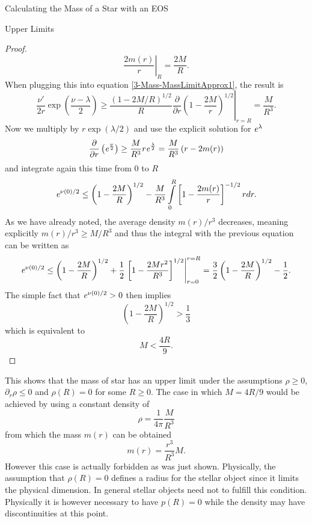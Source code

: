 \begin{section}{Calculating the Mass of a Star with an EOS}
\begin{subsection}{Upper Limits}
\begin{proof}
	\begin{equation}
		\left.\frac{2m(r)}{r}\right|_R = \frac{2M}{R}.
	\end{equation}
	When plugging this into equation \eqref{3-Mass-MassLimitApprox1}, the result is
	\begin{equation}
		\frac{\nu'}{2r}\exp\left(\frac{\nu-\lambda}{2}\right)\geq\frac{(1-2M/R)^{1/2}}{R}\left.\frac{\partial}{\partial r}\left(1-\frac{2M}{r}\right)^{1/2}\right|_{r=R} = \frac{M}{R^3}.
	\end{equation}
	Now we multiply by $r\exp(\lambda/2)$ and use the explicit solution for $\mathit{e}^\lambda$
	\begin{equation}
		\frac{\partial}{\partial r}\left(\mathit{e}^{\frac{\nu}{2}}\right) \geq \frac{M}{R^3}r\mathit{e}^\frac{\lambda}{2} = \frac{M}{R^3}\left(r-2m(r)\right)
	\end{equation}
	and integrate again this time from $0$ to $R$
	\begin{equation}
		\mathit{e}^{\nu(0)/2}\leq\left(1-\frac{2M}{R}\right)^{1/2}-\frac{M}{R^3}\int\limits_0^R\left[1-\frac{2m(r)}{r} \right]^{-1/2}rdr.
		\label{3-Mass-MassLimitNuApprox}
	\end{equation}
	As we have already noted, the average density $m(r)/r^3$ decreases, meaning explicitly $m(r)/r^3\geq M/R^3$ and thus the integral with the previous equation can be written as
	\begin{equation}
		\mathit{e}^{\nu(0)/2}\leq\left(1-\frac{2M}{R}\right)^{1/2}+\frac{1}{2}\left.\left[1-\frac{2Mr^2}{R^3} \right]^{1/2}\right|^{r=R}_{r=0} = \frac{3}{2}\left(1-\frac{2M}{R}\right)^{1/2} - \frac{1}{2}.
	\end{equation}
	The simple fact that $\mathit{e}^{\nu(0)/2}>0$ then implies
	\begin{equation}
		\left(1-\frac{2M}{R}\right)^{1/2} > \frac{1}{3}
	\end{equation}
	which is equivalent to
	\begin{equation}
		M< \frac{4R}{9}.
	\end{equation}
\end{proof}\noindent
This shows that the mass of star has an upper limit under the assumptions $\rho\geq0$, $\partial_r\rho\leq0$ and $\rho(R)=0$ for some $R\geq0$. The case in which $M=4R/9$ would be achieved by using a constant density of 
\begin{equation}
	\rho = \frac{1}{4\pi}\frac{M}{R^3}
\end{equation}
from which the mass $m(r)$ can be obtained
\begin{equation}
	m(r) = \frac{r^3}{R^3}M.
\end{equation}
However this case is actually forbidden as was just shown. Physically, the assumption that $\rho(R)=0$ defines a radius for the stellar object since it limits the physical dimension. In general stellar objects need not to fulfill this condition. Physically it is however necessary to have $p(R)=0$ while the density may have discontinuities at this point.
\end{subsection}
%
%
\end{section}
 
